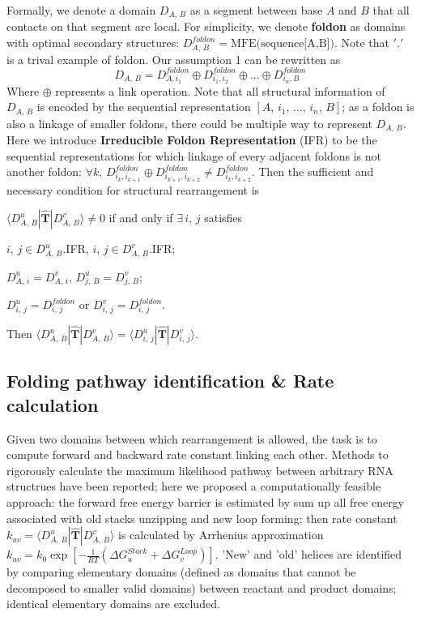 \documentclass[11pt, a4paper]{article}
\begin{document}
Formally, we denote a domain $D_{A,\,B}$ as a segment between base $A$ and $B$ that all contacts on that segment are local. For simplicity, we denote \textbf{foldon}
as domains with optimal secondary structures: $D^{foldon}_{A,\,B} = \text{MFE(sequence[A,B])}$. Note that $'.'$ is a trival example of foldon.
Our assumption 1 can be rewritten as
\begin{equation}
  D_{A,\,B} = D^{foldon}_{A, i_1} \oplus D^{foldon}_{i_1, i_2} \oplus ... \oplus D^{foldon}_{i_n, B}
\end{equation}
Where $\oplus$ represents a link operation. Note that all structural information of $D_{A,\,B}$ is encoded by the sequential representation $[A,\, i_1,\, ...,\, i_n,\, B]$;
 as a foldon is also a linkage of smaller foldons, there could be multiple way to represent $D_{A,\,B}$. Here we introduce \textbf{Irreducible Foldon Representation} (IFR) to be the
 sequential representations for which linkage of every adjacent foldons is not another foldon: $\forall k,\, D^{foldon}_{i_k, i_{k+1}} \oplus D^{foldon}_{i_{k+1}, i_{k+2}} \neq D^{foldon}_{i_{k}, i_{k+2}}$.
 Then the sufficient and necessary condition for structural rearrangement is

\begin{center}
  $\langle D^{u}_{A,\,B} | \hat{\mathbf{T}} | D^{v}_{A,\,B} \rangle \neq 0$ if and only if $\exists\, i,\,j$ satisfies

  $i,\,j \in D^{u}_{A,\,B}$.IFR, $i,\,j \in D^{v}_{A,\,B}$.IFR;

  $D^{u}_{A,\,i} = D^{v}_{A,\,i},\, D^{u}_{j,\,B} = D^{v}_{j,\,B}$;

  $D^{u}_{i,\,j} = D^{foldon}_{i,\,j}$ or $D^{v}_{i,\,j} = D^{foldon}_{i,\,j}$.

  Then $\langle D^{u}_{A,\,B} | \hat{\mathbf{T}} | D^{v}_{A,\,B} \rangle = \langle D^{u}_{i,\,j} | \hat{\mathbf{T}} | D^{v}_{i,\,j} \rangle$.
\end{center}

\subsection{Folding pathway identification \& Rate calculation} \label{section:rate}

Given two domains between which rearrangement is allowed, the task is to compute forward and backward rate constant
linking each other. Methods to rigorously calculate the maximum likelihood pathway between arbitrary RNA structrues have been reported\cite{Bayegan};
here we proposed a computationally feasible approach: the forward free energy barrier is estimated by sum up all free energy associated
with old stacks unzipping and new loop forming; then rate constant $k_{uv} = \langle D^{u}_{A,\,B} | \hat{\mathbf{T}} | D^{v}_{A,\,B} \rangle $ is calculated by Arrhenius approximation $k_{uv} = k_0 \exp[-\frac{1}{RT}(\Delta G^{Stack}_{u}+\Delta G^{Loop}_{v})]$. 'New' and 'old' helices are identified by comparing elementary domains (defined as domains that cannot be decomposed to smaller valid domains) between reactant and product domains; identical elementary domains are excluded.
\end{document}
